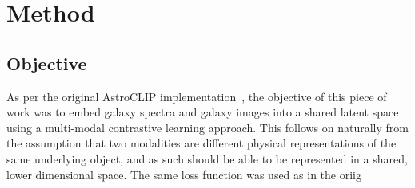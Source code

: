 
\section{Method}\label{sec:method}
\subsection{Objective}\label{subsec:objective}
As per the original AstroCLIP implementation~\citep{astroclip}, the objective of this piece of work was to embed galaxy
spectra and galaxy images into a shared latent space using a multi-modal contrastive learning approach.
This follows on naturally from the assumption that two modalities are different physical representations of the same
underlying object, and as such should be able to be represented in a shared, lower dimensional space.
The same loss function was used as in the oriig
